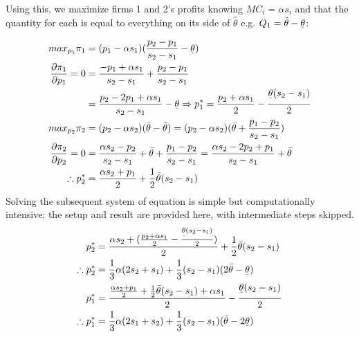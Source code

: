 \documentclass[12pt,letterpaper]{article}
\begin{document}
\begin{enumerate}
\begin{enumerate}
	Using this, we maximize firms 1 and 2's profits knowing $MC_i = \alpha s_i$ and that the quantity for each is equal to everything on its side of $\hat{\theta}$ e.g. $Q_1 = \hat{\theta} - \underset{\bar{}}{\theta}$:
	\begin{align*}
		max_{p_1} \pi_1 &= (p_1 - \alpha s_1)(\frac{p_2 - p_1}{s_2 - s_1} - \underset{\bar{}}{\theta}) \\
		\frac{\partial\pi_1}{\partial p_1} = 0&= \frac{-p_1 + \alpha s_1}{s_2 - s_1} + \frac{p_2 - p_1}{s_2 - s_1} \\
		&= \frac{p_2 - 2p_1 + \alpha s_1}{s_2 - s_1} - \underset{\bar{}}{\theta} 
		\Rightarrow p_1^* = \frac{p_2 + \alpha s_1}{2} - \frac{\underset{\bar{}}{\theta} (s_2 - s_1)}{2} \\
		max_{p_2} \pi_2 &= (p_2 - \alpha s_2)(\bar{\theta} - \hat{\theta}) = (p_2 - \alpha s_2)(\bar{\theta} + \frac{p_1 - p_2}{s_2 - s_1}) \\ 
		\frac{\partial \pi_2}{\partial p_2} = 0 &= \frac{\alpha s_2 - p_2}{s_2 - s_1} + \bar{\theta} + \frac{p_1 - p_2}{s_2 - s_1} = \frac{\alpha s_2 - 2p_2 + p_1}{s_2-s_1} + \bar{\theta} \\
		\therefore p_2^* &= \frac{\alpha s_2 + p_1}{2} + \frac{1}{2} \bar{\theta}(s_2-s_1) \\
	\end{align*}
	Solving the subsequent system of equation is simple but computationally intensive; the setup and result are provided here, with intermediate steps skipped.
	\begin{align*}
		p_2^* &= \frac{\alpha s_2 + (\frac{p_2 + \alpha s_1}{2} - \frac{\underset{\bar{}}{\theta} (s_2 - s_1)}{2})}{2} + \frac{1}{2} \bar{\theta}(s_2-s_1)	\\
		\therefore p_2^* &= \frac{1}{3}\alpha(2s_2 + s_1) + \frac{1}{3}(s_2 - s_1)(2\bar{\theta} - \underset{\bar{}}{\theta}) \\
		p_1^* &= \frac{\frac{\alpha s_2 + p_1}{2} + \frac{1}{2} \bar{\theta}(s_2-s_1) + \alpha s_1}{2} - \frac{\underset{\bar{}}{\theta} (s_2 - s_1)}{2} \\
		\therefore p_1^* &= \frac{1}{3}\alpha(2s_1 + s_2) + \frac{1}{3}(s_2 -s_1)(\bar{\theta} - 2\underset{\bar{}}{\theta})
	\end{align*}


\end{enumerate}
\end{enumerate}
\end{document}
